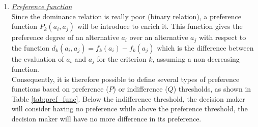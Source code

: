 \begin{enumerate}
\item \textit{\underline{Preference function}}\\
Since the dominance relation is really poor (binary relation), a preference function $P_k(a_i,a_j)$ will be introduce to enrich it. This function gives the preference degree of an alternative $a_i$ over an alternative $a_j$ with respect to the function $d_k(a_i,a_j) = f_k(a_i) - f_k(a_j)$ which is the difference between the evaluation of $a_i$ and $a_j$ for the criterion $k$, assuming a non decreasing function.\\
Consequently, it is therefore possible to define several types of preference functions based on preference ($P$) or indifference ($Q$) thresholds, as shown in Table \ref{tab:pref_func}. Below the indifference threshold, the decision maker will consider having no preference while above the preference threshold, the decision maker will have no more difference in its preference.


\end{enumerate}
